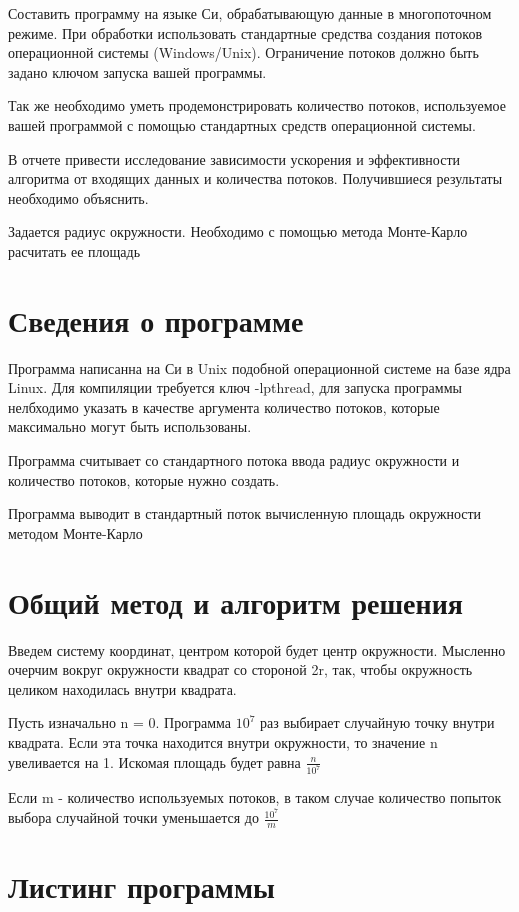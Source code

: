 \documentclass[pdf, unicode, 12pt, a4paper,oneside,fleqn]{article}
\begin{document}
Составить программу на языке Си, обрабатывающую данные в многопоточном
режиме. При обработки использовать стандартные средства создания потоков
операционной системы (Windows/Unix). Ограничение потоков должно быть задано 
ключом запуска вашей программы.

Так же необходимо уметь продемонстрировать количество потоков, используемое 
вашей программой с помощью стандартных средств операционной системы.

В отчете привести исследование зависимости ускорения и эффективности 
алгоритма от входящих данных и количества потоков. Получившиеся результаты 
необходимо объяснить.

Задается радиус окружности. Необходимо с помощью метода Монте-Карло расчитать ее площадь

\section{Сведения о программе}

Программа написанна на Си в Unix подобной операционной системе на базе ядра Linux.
Для компиляции требуется ключ -lpthread, для запуска программы нелбходимо указать
в качестве аргумента количество потоков, которые максимально могут быть использованы.

Программа считывает со стандартного потока ввода радиус окружности и количество потоков, которые нужно создать.

Программа выводит в стандартный поток вычисленную площадь окружности методом Монте-Карло

\section{Общий метод и алгоритм решения}

Введем систему координат, центром которой будет центр окружности. Мысленно очерчим вокруг 
окружности квадрат со стороной 2r, так, чтобы окружность целиком находилась внутри квадрата.

Пусть изначально n = 0.
Программа $10^7$ раз выбирает случайную точку внутри квадрата. Если эта точка находится внутри окружности, то значение n увеливается на 1. Искомая площадь будет равна $\frac{n}{10^7}$

Если m - количество используемых потоков, в таком случае количество попыток выбора случайной точки уменьшается до  $\frac{10^7}{m}$
\section{Листинг программы}
\end{document}
